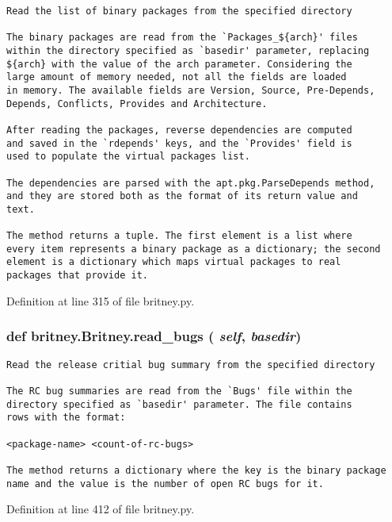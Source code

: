 \footnotesize\begin{verbatim}Read the list of binary packages from the specified directory

The binary packages are read from the `Packages_${arch}' files
within the directory specified as `basedir' parameter, replacing
${arch} with the value of the arch parameter. Considering the
large amount of memory needed, not all the fields are loaded
in memory. The available fields are Version, Source, Pre-Depends,
Depends, Conflicts, Provides and Architecture.

After reading the packages, reverse dependencies are computed
and saved in the `rdepends' keys, and the `Provides' field is
used to populate the virtual packages list.

The dependencies are parsed with the apt.pkg.ParseDepends method,
and they are stored both as the format of its return value and
text.

The method returns a tuple. The first element is a list where
every item represents a binary package as a dictionary; the second
element is a dictionary which maps virtual packages to real
packages that provide it.
\end{verbatim}
\normalsize
 

Definition at line 315 of file britney.py.
\subsubsection{\setlength{\rightskip}{0pt plus 5cm}def britney.Britney.read\_\-bugs ( {\em self},  {\em basedir})}\label{classbritney_1_1Britney_6c777aae69e7bec2efebaf23ddd4a86c}




\footnotesize\begin{verbatim}Read the release critial bug summary from the specified directory

The RC bug summaries are read from the `Bugs' file within the
directory specified as `basedir' parameter. The file contains
rows with the format:

<package-name> <count-of-rc-bugs>

The method returns a dictionary where the key is the binary package
name and the value is the number of open RC bugs for it.
\end{verbatim}
\normalsize
 

Definition at line 412 of file britney.py.
